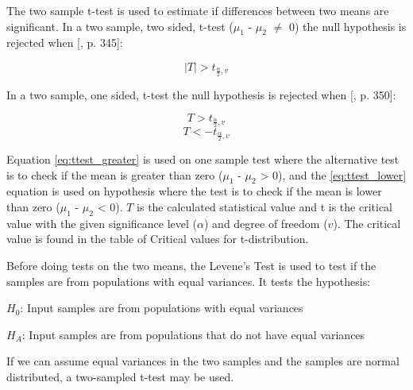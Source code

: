 The two sample t-test is used to estimate if differences between two means are significant. In a two sample, two sided, t-test ($\mu_{1}$ - $\mu_{2}$ $\neq$ 0) the null hypothesis is rejected when [\citep{Walpole2012}, p. 345]:

\begin{equation}
\label{eq:ttest_twoway}
|T| > t_{\frac{\alpha}{2}, v} 
\end{equation}

In a two sample, one sided, t-test the null hypothesis is rejected when [\citep{Walpole2012}, p. 350]:

\begin{equation}
\label{eq:ttest_greater}
T > t_{\frac{\alpha}{2}, v}
\end{equation}
\begin{equation}
\label{eq:ttest_lower}
T < - t_{\frac{\alpha}{2}, v}
\end{equation}

Equation \ref{eq:ttest_greater} is used on one sample test where the alternative test is to check if the mean is greater than zero ($\mu_{1}$ - $\mu_{2}$ > 0), and the \ref{eq:ttest_lower} equation is used on hypothesis where the test is to check if the mean is lower than zero ($\mu_{1}$ - $\mu_{2}$ < 0). $T$ is the calculated statistical value and t is the critical value with the given significance level ($\alpha$) and degree of freedom ($v$). The critical value is found in the table of Critical values for t-distribution. \newline 
 
Before doing tests on the two means, the Levene's Test is used to test if the samples are from populations with equal variances. It tests the hypothesis:\newline %

\centerline{$H_{0}$: Input samples are from populations with equal variances} 
\centerline{$H_{A}$: Input samples are from populations that do not have equal variances}

If we can assume equal variances in the two samples and the samples are normal distributed, a two-sampled t-test may be used. 


